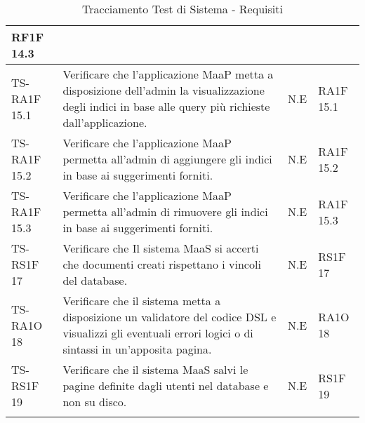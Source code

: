 \begin{center}
\begin{longtable}{| p{3cm} | p{6cm} | p{1.5cm} | p{2cm} | }
            RF1F 14.3 \newline  \\ \hline 
        TS-RA1F 15.1 & 
        Verificare che l’applicazione MaaP metta a disposizione dell’admin la visualizzazione degli indici in base alle query più richieste dall’applicazione. & N.E &       
            RA1F 15.1 \newline  \\ \hline 
        TS-RA1F 15.2 & 
        Verificare che l’applicazione MaaP permetta all’admin di aggiungere gli indici in base ai suggerimenti forniti. & N.E &       
            RA1F 15.2 \newline  \\ \hline 
        TS-RA1F 15.3 & 
        Verificare che l’applicazione MaaP permetta all’admin di rimuovere gli indici in base ai suggerimenti forniti. & N.E &       
            RA1F 15.3 \newline  \\ \hline 
        TS-RS1F 17 & 
        Verificare che Il sistema MaaS si accerti che documenti creati rispettano i vincoli del database. & N.E &       
            RS1F 17 \newline  \\ \hline 
        TS-RA1O 18 & 
        Verificare che il sistema metta a disposizione un validatore del codice DSL e visualizzi gli eventuali errori logici o di sintassi in un'apposita pagina. & N.E &       
            RA1O 18 \newline  \\ \hline 
        TS-RS1F 19 & 
        Verificare che il sistema MaaS salvi le pagine definite dagli utenti nel database e non su disco. & N.E &       
            RS1F 19 \newline  \\ \hline 
    \caption{Tracciamento Test di Sistema - Requisiti}
    \end{longtable}
   \egroup
\end{center}